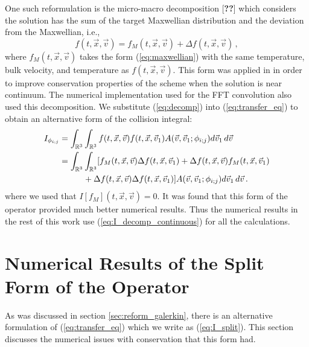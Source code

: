 \documentclass[12pt]{CSUNthesis}
\def\R{\mathbb{R}}
\def\R{\mathbb{R}}
\newcommand{\vecx}{\vec{x}}
\newcommand{\vecv}{\vec{v}}
\begin{document}
One such reformulation is the micro-macro decomposition [{\bf ??}] which considers the solution has the sum of the target Maxwellian distribution and the deviation from the Maxwellian, i.e.,
\begin{equation}
\label{eq:decomp}
f(t,\vecx,\vecv) = f_M(t, \vecx, \vecv) + \Delta f(t,\vecx,\vecv)\, ,
\end{equation}
where $f_M(t,\vecx,\vecv)$ takes the form (\ref{eq:maxwellian}) with the same temperature, bulk velocity, and temperature as $f(t,\vecx,\vecv)$. This form was applied in \cite{AlekseenkoJosyula2012} in order to improve conservation properties of the scheme when the solution is near continuum. The numerical implementation used for the FFT convolution also used this decomposition. We substitute (\ref{eq:decomp}) into (\ref{eq:transfer_eq}) to obtain an alternative form of the collision integral:
\begin{align}
\label{eq:I_decomp_continuous}
I_{\phi_{i;j}}&= \int_{\R^3}\int_{\R^3} f(t,\vec{x},\vec{v}) f(t,\vec{x},\vec{v}_{1})
 A(\vec{v},\vec{v}_{1};\phi_{i;j})   d\vec{v}_{1}\, d\vec{v}\, \nonumber \\
 &=\int_{\R^3}\int_{\R^3} [f_{M}(t,\vec{x},\vec{v}) \Delta f(t,\vec{x},\vec{v}_{1})
 +\Delta f(t,\vec{x},\vec{v}) f_{M}(t,\vec{x},\vec{v}_{1})\nonumber \\
 &\hspace*{10mm}{}+ \Delta f(t,\vec{x},\vec{v}) \Delta f(t,\vec{x},\vec{v}_{1})]
 A(\vec{v},\vec{v}_{1};\phi_{i;j})   d\vec{v}_{1}\, d\vec{v}\, . 
\end{align}
where we used that $I[f_M](t,\vecx,\vecv)=0$. It was found that this form of the operator provided much better numerical results. Thus the numerical results in the rest of this work use (\ref{eq:I_decomp_continuous}) for all the calculations. 

\section{Numerical Results of the Split Form of the Operator}
As was discussed in section \ref{sec:reform_galerkin}, there is an alternative formulation of (\ref{eq:transfer_eq}) which we write as (\ref{eq:I_split}). This section discusses the numerical issues with conservation that this form had.
\end{document}
